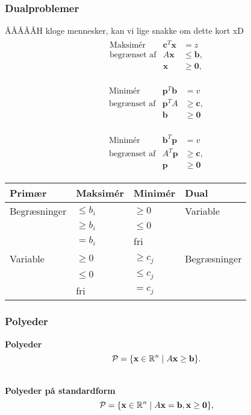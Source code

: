 \begin{frame}
\frametitle{Dualproblemer}
ÅÅÅÅÅH kloge mennesker, kan vi lige snakke om dette kort xD 
\begin{align*}
\begin{array}{lrl}
\text{Maksimér}		&\textbf{c}^T\textbf{x}	& = z		\\
\text{begrænset af}	&A\textbf{x}	&\leq \mathbf{b},	\\
					&\mathbf{x}				&\geq \mathbf{0},
\end{array}
\end{align*}
%

%
\begin{align*}
\begin{array}{lrl}
\text{Minimér}		&\textbf{p}^T\textbf{b}	& = v			\\
\text{begrænset af}	&\textbf{p}^TA	&\geq \mathbf{c},	\\
					&\mathbf{b}				&\geq \mathbf{0}
\end{array}
\end{align*}

\begin{align*}
\begin{array}{lrl}
\text{Minimér}		&\textbf{b}^T\textbf{p}	& = v			\\
\text{begrænset af}	&A^T \textbf{p}	&\geq \mathbf{c},	\\
					&\mathbf{p}				&\geq \mathbf{0}
\end{array}
\end{align*}
\begin{center}
\begin{tabular}{llll}
Primær  & Maksimér   & Minimér    & Dual         \\
\hline
Begræsninger & $\leq b_i$ & $\geq 0$   & Variable     \\
             & $\geq b_i$ & $\leq 0$   &              \\
             & $=b_i$     & fri        &            \\ 
\hline             
Variable     & $\geq 0$   & $\geq c_j$ & Begræsninger \\
             & $\leq 0$   & $\leq c_j$ &              \\
             & fri        & $=c_j$     &  
\end{tabular}
\end{center}
\end{frame}

\begin{frame}
\frametitle{Polyeder}
\textbf{Polyeder}
$$\mathcal{P} = \{\textbf{x} \in \R^n \mid A\mathbf{x}\geq \textbf{b}\}.$$
\\
$
\begin{array}{cc}
&

\end{array}
$
\\
\textbf{Polyeder på standardform} 
$$\mathcal{P}=\{ \mathbf{x} \in \R^n  \mid  A\mathbf{x}=\mathbf{b}, \mathbf{x} \geq \mathbf{0} \},$$
\end{frame}

